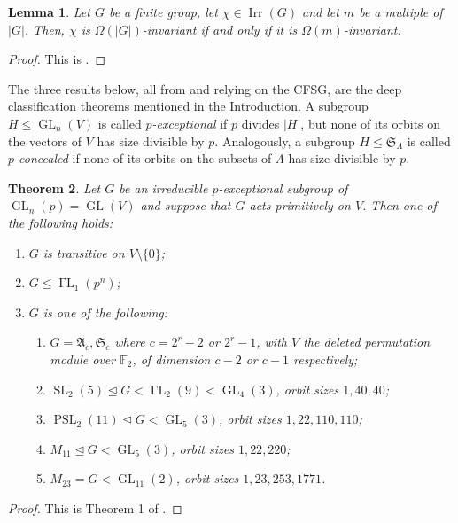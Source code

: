 \documentclass[12pt]{amsart}
\theoremstyle{theorem}
\newtheorem{teo}{Theorem}
\newtheorem{lem}[teo]{Lemma}
\theoremstyle{definition}
\newcommand{\fA} {\mathfrak A}
\newcommand{\fS} {\mathfrak S}
\newcommand{\FF}{{\mathbb{F}}}
\newcommand{\Irr}{{\operatorname{Irr}}}
\newcommand{\GL}{\operatorname{GL}}
\newcommand{\GaL}{\operatorname{\Gamma L}}
\newcommand{\SL}{\operatorname{SL}}
\newcommand{\PSL}{\operatorname{PSL}}
\begin{document}
	\begin{lem}
		Let $G$ be a finite group, let $\chi \in \Irr(G)$ and let $m$ be a multiple of $|G|$. Then, $\chi$ is $\Omega(|G|)$-invariant if and only if it is $\Omega(m)$-invariant.
	\end{lem}
	
	\begin{proof}
		This is \cite[Corollary 2.2]{MMRSF}.
	\end{proof}
	
	The three results below, all from \cite{GLPST} and relying on the CFSG, are the deep classification theorems mentioned in the Introduction. A subgroup $H \leq \GL_n(V)$ is called \emph{$p$-exceptional} if $p$ divides $|H|$, but none of its orbits on the vectors of $V$ has size divisible by $p$. Analogously, a subgroup $H \leq \fS_{\Lambda}$ is called \emph{$p$-concealed} if none of its orbits on the subsets of $\Lambda$ has size divisible by $p$.
	
	\begin{teo}   \label{t1}
		Let $G$ be an irreducible $p$-exceptional subgroup of $\GL_n(p)=\GL(V)$
		and suppose that $G$ acts primitively on $V$. Then one of the following holds:
		\begin{enumerate}
			\item $G$ is transitive on $V\setminus\{0\}$;
			\item $G\leq\GaL_1(p^n)$;
			\item $G$ is one of the following:
			\begin{enumerate}
				\item[(i)] $G=\fA_c, \fS_c$ where $c=2^r-2$ or $2^r-1$, with $V$ the deleted
				permutation module over $\FF_2$, of dimension $c-2$ or $c-1$
				respectively;
				\item[(ii)] $\SL_2(5)\trianglelefteq G< \GaL_2(9)<\GL_4(3)$,
				orbit sizes $1,40,40$;
				\item[(iii)] $\PSL_2(11)\trianglelefteq G<\GL_5(3)$, orbit sizes $1,22,110,110$;
				\item[(iv)] $M_{11}\trianglelefteq G<\GL_5(3)$, orbit sizes $1,22,220$;
				\item[(v)] $M_{23}=G<\GL_{11}(2)$, orbit sizes $1,23,253,1771$.
			\end{enumerate}
		\end{enumerate}
	\end{teo}
	
	\begin{proof}
		This is Theorem 1 of \cite{GLPST}.
	\end{proof}
	
\end{document}
